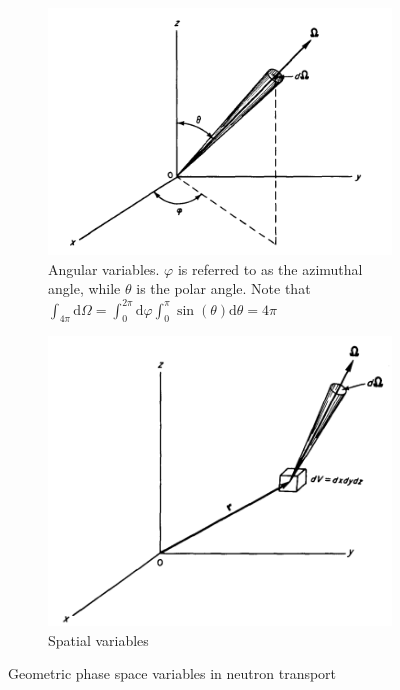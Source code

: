 \documentclass{article}
\begin{document}
\begin{figure}[h]
     \centering
     \begin{subfigure}{0.45\textwidth}
         \centering
         \includegraphics[width=1\textwidth]{angular.png}
         \caption{Angular variables. $\varphi$ is referred to as the azimuthal angle, while $\theta$ is the polar angle. Note that $\int_{4\pi}\mathrm{d}\Omega = \int^{2\pi}_0\mathrm{d}\varphi\int^{\pi}_{0}\sin(\theta)\mathrm{d}\theta = 4\pi$}
     \end{subfigure}
     \begin{subfigure}{0.45\textwidth}
         \centering
         \includegraphics[width=1\textwidth]{volume.png}
         \caption{Spatial variables}
     \end{subfigure}
        \caption{Geometric phase space variables in neutron transport~\cite{Bell}}
        \label{fig:phase_space}
\end{figure}
\end{document}
